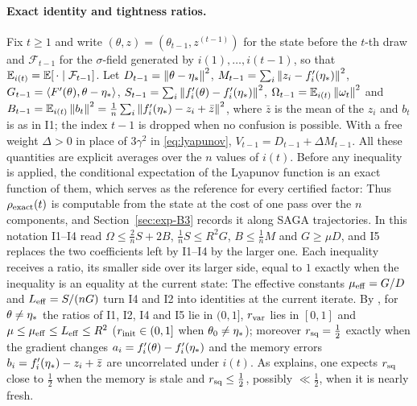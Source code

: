 \paragraph{Exact identity and tightness ratios.}
Fix $t\ge1$ and write $(\theta,z)=(\theta_{t-1},z^{(t-1)})$ for the state before the $t$-th draw and
$\mathcal F_{t-1}$ for the $\sigma$-field generated by $i(1),\dots,i(t-1)$, so that $\mathbb{E}_{i(t)}=\mathbb{E}[\,\cdot\mid\mathcal F_{t-1}]$.
Let $D_{t-1}=\left\|\theta-\eta_\ast\right\|^2$, $M_{t-1}=\sum_i\left\|z_i-f'_i(\eta_\ast)\right\|^2$,
$G_{t-1}=\left\langle F'(\theta), \theta-\eta_\ast \right\rangle$, $S_{t-1}=\sum_i\left\|f'_i(\theta)-f'_i(\eta_\ast)\right\|^2$,
$\Omega_{t-1}=\mathbb{E}_{i(t)}\left\|\omega_t\right\|^2$ and $B_{t-1}=\mathbb{E}_{i(t)}\left\|b_t\right\|^2=\frac1n\sum_i\left\|f'_i(\eta_\ast)-z_i+\bar z\right\|^2$, where
$\bar z$ is the mean of the $z_i$ and $b_t$ is as in I1; the index $t-1$ is dropped when no confusion is possible. With a
free weight $\Delta>0$ in place of $3\gamma^2$ in \eqref{eq:lyapunov}, $V_{t-1}=D_{t-1}+\Delta M_{t-1}$. All these
quantities are explicit averages over the $n$ values of $i(t)$. Before any inequality is applied, the conditional
expectation of the Lyapunov function is an exact function of them, which serves as the reference for every certified
factor:
Thus $\rho_{\rm exact}(t)$ is computable from the state at the cost of one pass over the $n$ components, and
Section~\ref{sec:exp-B3} records it along SAGA trajectories. In this notation I1--I4 read $\Omega\le\frac2nS+2B$,
$\frac1nS\le R^2G$, $B\le\frac1nM$ and $G\ge\mu D$, and I5 replaces the two coefficients left by I1--I4 by the larger
one. Each inequality receives a ratio, its smaller side over its larger side, equal to $1$ exactly when the inequality
is an equality at the current state:
The effective constants $\mu_{\mathrm{eff}}=G/D$ and $L_{\mathrm{eff}}=S/(nG)$ turn I4 and I2 into identities at the current iterate. By
, for $\theta\ne\eta_\ast$ the ratios of I1, I2, I4 and I5 lie in $(0,1]$, $r_{\rm var}$ lies in
$[0,1]$ and $\mu\le\mu_{\mathrm{eff}}\le L_{\mathrm{eff}}\le R^2$ ($r_{\rm init}\in(0,1]$ when $\theta_0\ne\eta_\ast$); moreover $r_{\rm sq}=\frac12$
exactly when the gradient changes $a_i=f'_i(\theta)-f'_i(\eta_\ast)$ and the memory errors $b_i=f'_i(\eta_\ast)-z_i+\bar z$
are uncorrelated under $i(t)$. As  explains, one expects $r_{\rm sq}$ close to $\frac12$ when the
memory is stale and $r_{\rm sq}\le\frac12$, possibly $\ll\frac12$, when it is nearly fresh.

